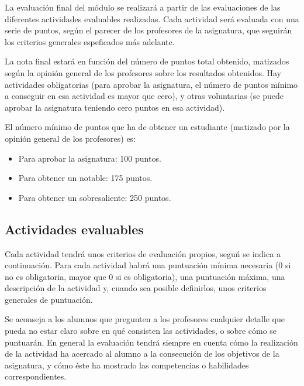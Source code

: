 \documentclass[a4paper,12pt]{article}
\begin{document}
La evaluación final del módulo se realizará a partir de las evaluaciones de las diferentes actividades evaluables realizadas. Cada actividad será evaluada con una serie de puntos, según el parecer de los profesores de la asignatura, que seguirán los criterios generales espeficados más adelante.

La nota final estará en función del número de puntos total obtenido, matizados según la opinión general de los profesores sobre los resultados obtenidos. Hay actividades obligatorias (para aprobar la asignatura, el número de puntos mínimo a conseguir en esa actividad es mayor que cero), y otras voluntarias (se puede aprobar la asignatura teniendo cero puntos en esa actividad).

El número mínimo de puntos que ha de obtener un estudiante (matizado por la opinión general de los profesores) es:

\begin{itemize}
\item Para aprobar la asignatura: 100 puntos.
\item Para obtener un notable: 175 puntos.
\item Para obtener un sobresaliente: 250 puntos.
\end{itemize}

\subsection{Actividades evaluables}

Cada actividad tendrá unos criterios de evaluación propios, seguń se indica a continuación. Para cada actividad habrá una puntuación mínima necesaria (0 si no es obligatoria, mayor que 0 si es obligatoria), una puntuación máxima, una descripción de la actividad y, cuando sea posible definirlos, unos criterios generales de puntuación.

Se aconseja a los alumnos que pregunten a los profesores cualquier detalle que pueda no estar claro sobre en qué consisten las actividades, o sobre cómo se puntuarán. En general la evaluación tendrá siempre en cuenta cómo la realización de la actividad ha acercado al alumno a la consecución de los objetivos de la asignatura, y cómo éste ha mostrado las competencias o habilidades correspondientes.
\end{document}
